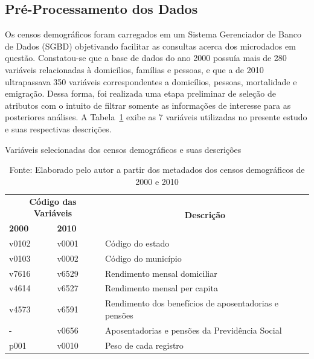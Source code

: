 \subsection{Pré-Processamento dos Dados}

Os censos demográficos foram carregados em um Sistema Gerenciador de Banco de Dados (SGBD) objetivando facilitar as consultas acerca dos microdados em questão. Constatou-se que a base de dados do ano 2000 possuía mais de 280 variáveis relacionadas à domicílios, famílias e pessoas, e que a de 2010 ultrapassava 350 variáveis correspondentes a domicílios, pessoas, mortalidade e emigração. Dessa forma, foi realizada uma etapa preliminar de seleção de atributos com o intuito de filtrar somente as informações de interesse para as posteriores análises. A Tabela~\ref{tab:cap04:variaveis} exibe as 7 variáveis utilizadas no presente estudo e suas respectivas descrições.
	
\begin{table}[!h]
    \centering
    \caption{Variáveis selecionadas dos censos demográficos e suas descrições} 
    \begin{tabular}{|p{2cm}|p{2cm}|p{10cm}|}
        \hline
        \multicolumn{2}{|c|}{\textbf{Código das Variáveis}} & \multicolumn{1}{c|}{\multirow{2}{*}{\textbf{Descrição}}} \\ \cline{1-2}
        \centering\textbf{2000} & \centering\textbf{2010} & \multicolumn{1}{c|}{} \\ \hline
        \centering v0102 & \centering v0001 & Código do estado \\ \hline
        \centering v0103 & \centering v0002 & Código do município \\ \hline
        \centering v7616 & \centering v6529 & Rendimento mensal domiciliar \\ \hline 
        \centering v4614 & \centering v6527 & Rendimento mensal per capita \\ \hline
        \centering v4573 & \centering v6591 & Rendimento dos benefícios de aposentadorias e pensões \\ \hline
        \centering - & \centering v0656 & Aposentadorias e pensões da Previdência Social \\ \hline
        \centering p001 & \centering v0010 & Peso de cada registro\\ \hline
    \end{tabular}
    \caption*{\footnotesize{Fonte: Elaborado pelo autor a partir dos metadados dos censos demográficos de 2000 e 2010}}
    \label{tab:cap04:variaveis}
\end{table}

